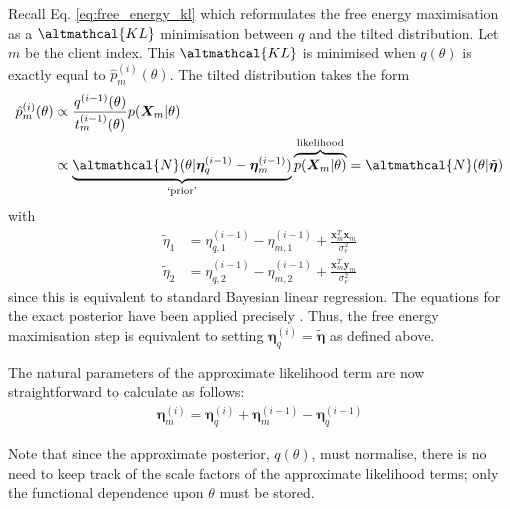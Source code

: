 Recall Eq. \eqref{eq:free_energy_kl} which reformulates the free energy maximisation as a $\altmathcal{KL}$ minimisation between $q$ and the tilted distribution. Let $m$ be the client index. This $\altmathcal{KL}$ is minimised when $q(\theta)$ is exactly equal to $\hat{p}_m^{(i)}(\theta)$. The tilted distribution takes the form
\begin{align}
\hat{p}^{(i)}_{m}(\theta) &\propto  \frac{q^{(i-1)}(\theta)}{t_{m}^{(i-1)}(\theta)} p(\bm{X}_{m}| \theta)\nonumber \\
&\propto \underbrace{\altmathcal{N}(\theta| \bm{\eta}_q^{(i-1)} - \bm{\eta}_m^{(i-1)})}_{\text{`prior'}} \overbrace{p(\bm{X}_{m}| \theta)}^{\text{likelihood}}
= \altmathcal{N}(\theta| \tilde{\bm{\eta}}) 
\end{align}
with
\begin{align}
\tilde{\eta}_1 &= \eta_{q, 1}^{(i-1)} - \eta_{m, 1}^{(i-1)} + \frac{\bm{x}_m^T \bm{x}_m}{\sigma_e^2} \label{eq:exact_update_one}\\ 
\tilde{\eta}_2 &= \eta_{q, 2}^{(i-1)} - \eta_{m, 2}^{(i-1)} + \frac{\bm{x}_m^T \bm{y}_m}{\sigma_e^2} \label{eq:exact_update_two}
\end{align}
since this is equivalent to standard Bayesian linear regression. The equations for the exact posterior have been applied precisely \citep{Bishop:2006}. Thus, the free energy maximisation step is equivalent to setting $\bm{\eta}_q^{(i)} = \tilde{\bm{\eta}}$ as defined above. 

The natural parameters of the approximate likelihood term are now straightforward to calculate as follows:
\begin{align}
\bm{\eta}_{m}^{(i)} = \bm{\eta}_{q}^{(i)} + \bm{\eta}_{m}^{(i-1)}  - \bm{\eta}_{q}^{(i-1)} 
\end{align}

Note that since the approximate posterior, $q(\theta)$, must normalise, there is no need to keep track of the scale factors of the approximate likelihood terms; only the functional dependence upon $\theta$ must be stored.

